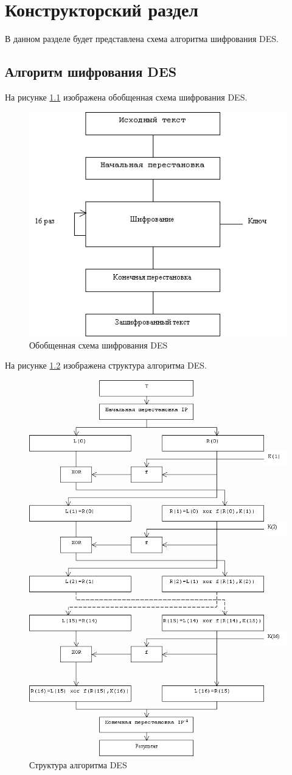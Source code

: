 \chapter{Конструкторский раздел}
\label{cha:design}

В данном разделе будет представлена схема алгоритма шифрования DES.

\section{Алгоритм шифрования DES}

На рисунке \ref{fig:des01} изображена обобщенная схема шифрования DES.


\begin{figure}[H]
	\centering
	\includegraphics[width=0.7\linewidth]{img/des_01}
	\caption{Обобщенная схема шифрования DES}
	\label{fig:des01}
\end{figure}

На рисунке \ref{fig:des3} изображена структура алгоритма DES.

\begin{figure}[H]
	\centering
	\includegraphics[width=0.7\linewidth]{img/des_3}
	\caption{Структура алгоритма DES}
	\label{fig:des3}
\end{figure}

